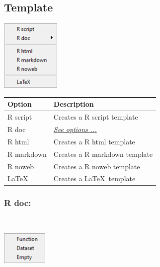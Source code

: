 \subsection{Template}

\includegraphics[scale=0.80]{./res/menu_file_template.png}\\

\begin{scriptsize}
  \begin{tabularx}{\textwidth}{>{\hsize=0.3\hsize}X>{\hsize=0.8\hsize}X}\\
    \hline
    \textbf{Option} & \textbf{Description} \\
    \hline
    R script & Creates a R script template \\
    R doc & \textit{\href{\#menu\_file\_template\_rdoc}{See options ...}} \\
    \hdashline[1pt/1pt]
    R html & Creates a R html template \\
    R markdown & Creates a R markdown template \\
    R noweb & Creates a R noweb template \\
    \hdashline[1pt/1pt]
    \LaTeX & Creates a \LaTeX ~template \\
    \hline
  \end{tabularx}
\end{scriptsize}


\newpage
\hypertarget{menu_file_template_rdoc}{}
\subsubsection{R doc:}\\

\includegraphics[scale=0.8]{./res/menu_file_template_rdoc.png}\\

